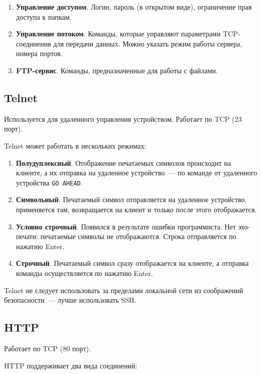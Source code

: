 \begin{enumerate}
    \item \textbf{Управление доступом}. Логин, пароль (в открытом виде), ограничение прав доступа к папкам.
    \item \textbf{Управление потоком}. Команды, которые управляют параметрами TCP-соединения для передачи данных. Можно указать режим работы сервера, номера портов.
    \item \textbf{FTP-сервис}. Команды, предназначенные для работы с файлами.
\end{enumerate}

\subsection{Telnet}

Используется для удаленного управления устройством. Работает по TCP (23 порт).

Telnet может работать в нескольких режимах:

\begin{enumerate}
    \item \textbf{Полудуплексный}. Отображение печатаемых символов происходит на клиенте, а их отправка на удаленное устройство~--- по команде от удаленного устройства \texttt{GO AHEAD}.
    \item \textbf{Символьный}. Печатаемый символ отправляется на удаленное устройство, применяется там, возвращается на клиент и только после этого отображается.
    \item \textbf{Условно строчный}. Появился в результате ошибки программиста. Нет эхо-печати: печатаемые символы не отображаются. Строка отправляется по нажатию Enter.
    \item \textbf{Строчный}. Печатаемый символ сразу отображается на клиенте, а отправка команды осуществляется по нажатию Enter.
\end{enumerate}

Telnet не следует использовать за пределами локальной сети из соображений
безопасности~--- лучше использовать SSH.

\subsection{HTTP}

Работает по TCP (80 порт).

HTTP поддерживает два вида соединений:

